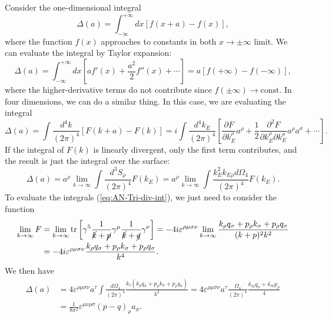 \documentclass[aps,prb,superscriptaddress,nofootinbib]{revtex4}
\def \tr{\operatorname{tr}}
\begin{document}
Consider the one-dimensional integral
\begin{equation}
	\Delta(a) = \int^{+\infty}_{-\infty} dx \left[f(x+a)-f(x)\right],
\end{equation}
where the function $f(x)$ approaches to constants in both $x \rightarrow \pm\infty$ limit.
We can evaluate the integral by Taylor expansion:
\begin{equation}
	\Delta(a) = \int^{+\infty}_{-\infty} dx \left[af'(x)+\frac{a^2}{2}f''(x)+\cdots\right]
	= a\left[f(+\infty)-f(-\infty)\right],
\end{equation}
where the higher-derivative terms do not contribute since $f(\pm\infty)\rightarrow \text{const}$. 
In four dimensions, we can do a similar thing.
In this case, we are evaluating the integral
\begin{equation}
	\Delta(a) 
	= \int \frac{d^4k}{(2\pi)^4} \left[F(k+a)-F(k)\right] 
	= i\int \frac{d^4k_E}{(2\pi)^4} \left[\frac{\partial F}{\partial k_E^\rho} a^\rho + \frac{1}{2} \frac{\partial^2 F}{\partial k_E^\rho \partial k_E^\sigma} a^\rho a^\sigma + \cdots\right].
\end{equation}
If the integral of $F(k)$ is linearly divergent, only the first term contributes, and the result is just the integral over the surface:
\begin{equation}
	\Delta(a) = a^\rho \lim_{k\rightarrow \infty} \int \frac{d^3 S_\rho}{(2\pi)^4} F(k_E) 
	= a^\rho \lim_{k\rightarrow \infty} \int \frac{k^2_E k_{E\rho} d \Omega_4}{(2\pi)^4} F(k_E).
\end{equation}
To evaluate the integrals (\ref{eq:AN-Tri-div-int}), we just need to consider the function
\begin{equation}
\begin{aligned}
	\lim_{k\rightarrow \infty} F 
	&= \lim_{k\rightarrow \infty} \tr\left[\gamma^{5} \frac{1}{\cancel k + \cancel p} \gamma^\mu \frac{1}{\cancel k+\cancel q}\gamma^{\nu}\right]
	= -4i \varepsilon^{\rho\mu\sigma\nu} \lim_{k\rightarrow \infty} \frac{k_\rho q_\sigma + p_\rho k_\sigma + p_\rho q_\sigma}{(k+p)^2 k^2} \\
	&= -4i \varepsilon^{\rho\mu\sigma\nu} \frac{k_\rho q_\sigma + p_\rho k_\sigma + p_\rho q_\sigma}{k^4}.
\end{aligned}
\end{equation}
We then have
\begin{equation}\label{eq:AN-CH-int-form}
\begin{aligned}
	\Delta(a) 
	&= 4 \varepsilon^{\rho\mu\sigma\nu} a^\tau \int \frac{d \Omega_4}{(2\pi)^4} \frac{k_\tau (k_\rho q_\sigma + p_\rho k_\sigma + p_\rho q_\sigma)}{k^2} 
	= 4 \varepsilon^{\rho\mu\sigma\nu} a^\tau \frac{\Omega_4}{(2\pi)^4} \frac{\delta_{\tau\rho}q_\sigma + \delta_{\tau\sigma}p_\rho}{4} \\
	&= \frac{1}{8\pi^2} \varepsilon^{\mu\nu\rho\sigma} (p-q)_\rho a_\sigma.
\end{aligned}
\end{equation}
\end{document}
